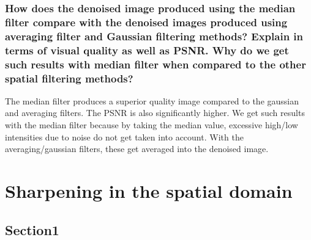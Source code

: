 \documentclass[article, 1.5space, letterpaper, 12pt, oneside, header, footer]{SydeClass}
\begin{document}
\subsubsection{How does the denoised image produced using the median filter compare with the denoised images
produced using averaging filter and Gaussian filtering methods? Explain in terms of visual quality
as well as PSNR. Why do we get such results with median filter when compared to the other spatial
filtering methods?}
The median filter produces a superior quality image compared to the gaussian and averaging filters. The PSNR is also significantly higher. We get such results with the median filter because by taking the median value, excessive high/low intensities due to noise do not get taken into account. With the averaging/gaussian filters, these get averaged into the denoised image.



\section{Sharpening in the spatial domain}

\subsection{Section1}
\begin{figure}[ht]
\centering
\end{figure}
\end{document}
